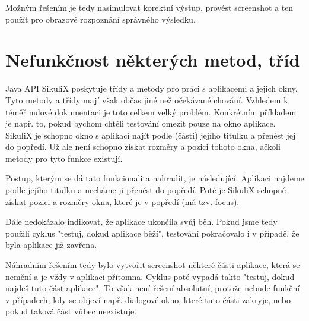 	Možným řešením je tedy nasimulovat korektní výstup, provést screenshot a ten použít pro obrazové rozpoznání správného výsledku.
	
	\section{Nefunkčnost některých metod, tříd}
	Java API SikuliX poskytuje třídy a metody pro práci s aplikacemi a jejich okny. Tyto metody a třídy mají však občas jiné než očekávané chování. Vzhledem k téměř nulové dokumentaci je toto celkem velký problém. Konkrétním příkladem je např. to, pokud bychom chtěli testování omezit pouze na okno aplikace. SikuliX je schopno okno s aplikací najít podle (části) jejího titulku a přenést jej do popředí. Už ale není schopno získat rozměry a pozici tohoto okna, ačkoli metody pro tyto funkce existují.
	
	Postup, kterým se dá tato funkcionalita nahradit, je následující. Aplikaci najdeme podle jejího titulku a necháme ji přenést do popředí. Poté je SikuliX schopné získat pozici a rozměry okna, které je v popředí (má tzv. focus).
	
	Dále nedokázalo indikovat, že aplikace ukončila svůj běh. Pokud jsme tedy použili cyklus "testuj, dokud aplikace běží", testování pokračovalo i v případě, že byla aplikace již zavřena.
	
	Náhradním řešením tedy bylo vytvořit screenshot některé části aplikace, která se nemění a je vždy v aplikaci přítomna. Cyklus poté vypadá takto "testuj, dokud najdeš tuto část aplikace". To však není řešení absolutní, protože nebude funkční v případech, kdy se objeví např. dialogové okno, které tuto části zakryje, nebo pokud taková část vůbec neexistuje.